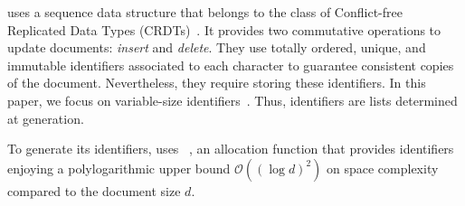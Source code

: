 \CRATE uses a sequence data structure that belongs to the class of Conflict-free
Replicated Data Types (CRDTs)~\cite{shapiro2011conflict,
  shapiro2011comprehensive}. It provides two commutative operations to update
documents: \emph{insert} and \emph{delete}.  They use totally ordered, unique,
and immutable identifiers associated to each character to guarantee consistent
copies of the document. Nevertheless, they require storing these identifiers. In
this paper, we focus on variable-size identifiers~\cite{preguica2009commutative,
  weiss2009logoot}. Thus, identifiers are lists determined at generation.

To generate its identifiers, \CRATE uses \LSEQ~\cite{nedelec2013lseq}, an
allocation function that provides identifiers enjoying a polylogarithmic upper
bound $\mathcal{O}((\log d)^2)$ on space complexity compared to the document
size $d$. 




